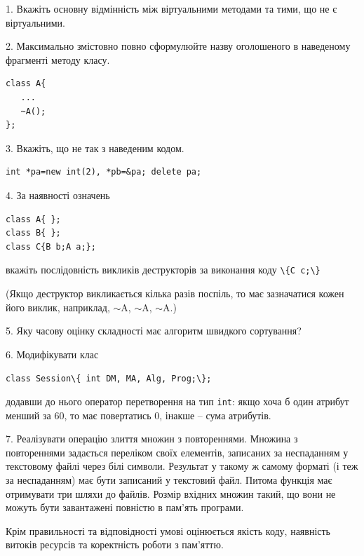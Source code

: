 \documentclass[12pt, ukrainian]{article}
\def\code#1{\Verb!#1!}
\begin{document}
{%
1. Вкажіть основну відмінність між віртуальними методами та тими, що не є віртуальними.%
\par
\vspace{2mm}
2. Максимально змістовно повно сформулюйте назву оголошеного в наведеному фрагменті методу класу.
\vspace{-3mm}
\begin{verbatim}class A{
   ...
   ~A();
};\end{verbatim}
\vspace{-3mm}
\par
\vspace{2mm}
3. Вкажіть, що не так з наведеним кодом.
\vspace{-3mm}
\begin{verbatim}int *pa=new int(2), *pb=&pa; delete pa;\end{verbatim}
\vspace{-3mm}
\par
\vspace{2mm}
4. За наявності означень
\vspace{-3mm}
\begin{verbatim}
class A{ };
class B{ };
class C{B b;A a;};\end{verbatim}
\vspace{-3mm}
вкажіть послідовність викликів деструкторів за виконання коду \code{\{C c;\}} 

(Якщо деструктор викликається кілька разів поспіль, то має зазначатися кожен його виклик, наприклад, $\sim$A, $\sim$A, $\sim$A.)

\vspace{2mm}
5. Яку часову оцінку складності має алгоритм швидкого сортування?
\par
\vspace{2mm}
6. Модифікувати клас 

\qquad\code{class Session\{ int DM, MA, Alg, Prog;\};} 


додавши до нього оператор перетворення на тип \code{int}: якщо хоча б один атрибут менший за 60, то має повертатись 0, інакше -- сума атрибутів.%
\par
\vspace{2mm}
7. 
Реалізувати операцію злиття множин з повтореннями. Множина з повтореннями задається переліком своїх елементів, записаних за неспаданням у текстовому файлі через білі символи. Результат у такому ж самому форматі (і теж за неспаданням) має бути записаний у текстовий файл. Питома функція має отримувати три шляхи до файлів. Розмір вхідних множин такий, що вони не можуть бути завантажені повністю в пам’ять програми.

Крім правильності та відповідності умові оцінюється якість коду, наявність витоків ресурсів та коректність роботи з пам'яттю. 

}
\end{document}
